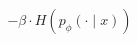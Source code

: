 \documentclass[preview]{standalone}
\begin{document}
\begin{align*}
- \beta \cdot H\!\left(p_\phi(\cdot \mid x)\right)
\end{align*}
\end{document}

